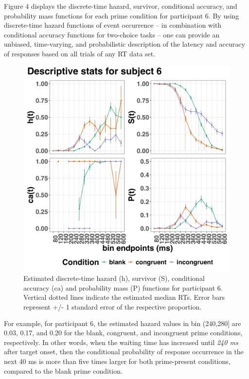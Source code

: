 \documentclass[
  man, donotrepeattitle,floatsintext]{apa6}
\begin{document}
Figure 4 displays the discrete-time hazard, survivor, conditional accuracy, and probability mass functions for each prime condition for participant 6. By using discrete-time hazard functions of event occurrence -- in combination with conditional accuracy functions for two-choice tasks -- one can provide an unbiased, time-varying, and probabilistic description of the latency and accuracy of responses based on all trials of any RT data set.



\begin{figure}[H]

{\centering \includegraphics[width=0.9\linewidth,height=0.67\textheight,]{../Tutorial_1_descriptive_stats/figures/Plot_for_subject6_PanisSchmidt} 

}

\caption{Estimated discrete-time hazard (h), survivor (S), conditional accuracy (ca) and probability mass (P) functions for participant 6. Vertical dotted lines indicate the estimated median RTs. Error bars represent +/- 1 standard error of the respective proportion.}\label{fig:eha-plot}
\end{figure}

For example, for participant 6, the estimated hazard values in bin (240,280{]} are 0.03, 0.17, and 0.20 for the blank, congruent, and incongruent prime conditions, respectively. In other words, when the waiting time has increased until \emph{240 ms} after target onset, then the conditional probability of response occurrence in the next 40 ms is more than five times larger for both prime-present conditions, compared to the blank prime condition.
\end{document}
